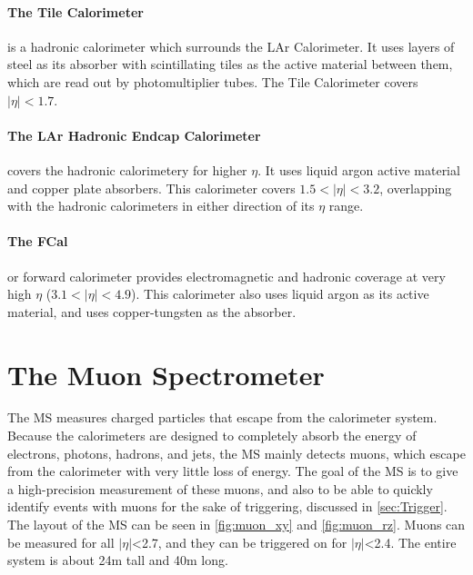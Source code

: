 \paragraph{The Tile Calorimeter} is a hadronic calorimeter which surrounds the LAr Calorimeter. It uses layers of steel as its absorber with scintillating tiles as the active material between them, which are read out by photomultiplier tubes. The Tile Calorimeter covers $|\eta| < 1.7$. 

\paragraph{The LAr Hadronic Endcap Calorimeter} covers the hadronic calorimetery for higher $\eta$. It uses liquid argon active material and copper plate absorbers. This calorimeter covers $1.5 < |\eta| < 3.2$, overlapping with the hadronic calorimeters in either direction of its $\eta$ range. 

\paragraph{The FCal} or forward calorimeter provides electromagnetic and hadronic coverage at very high $\eta$ ($3.1 < |\eta| < 4.9$). This calorimeter also uses liquid argon as its active material, and uses copper-tungsten as the absorber. 

\section{The Muon Spectrometer}
\label{sec:MS}

The \ac{MS} measures charged particles that escape from the calorimeter system. Because the calorimeters are designed to completely absorb the energy of electrons, photons, hadrons, and jets, the \ac{MS} mainly detects muons, which escape from the calorimeter with very little loss of energy. The goal of the \ac{MS} is to give a high-precision measurement of these muons, and also to be able to quickly identify events with muons for the sake of triggering, discussed in \autoref{sec:Trigger}. The layout of the \ac{MS} can be seen in \autoref{fig:muon_xy} and \autoref{fig:muon_rz}. Muons can be measured for all $|\eta|$<2.7, and they can be triggered on for $|\eta|$<2.4. The entire system is about 24m tall and 40m long. 

